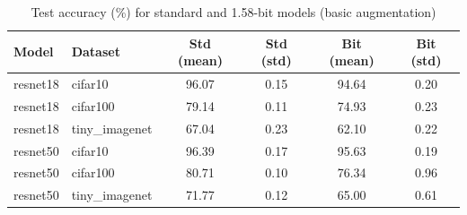 \begin{table}[h]
\centering
\caption{Test accuracy (\%) for standard and 1.58-bit models (basic augmentation)}
\label{tab:accuracy_basic}
\begin{tabular}{llcccc}
\toprule
Model & Dataset & Std (mean) & Std (std) & Bit (mean) & Bit (std) \\
\midrule
resnet18 & cifar10 & 96.07 & 0.15 & 94.64 & 0.20 \\
resnet18 & cifar100 & 79.14 & 0.11 & 74.93 & 0.23 \\
resnet18 & tiny_imagenet & 67.04 & 0.23 & 62.10 & 0.22 \\
resnet50 & cifar10 & 96.39 & 0.17 & 95.63 & 0.19 \\
resnet50 & cifar100 & 80.71 & 0.10 & 76.34 & 0.96 \\
resnet50 & tiny_imagenet & 71.77 & 0.12 & 65.00 & 0.61 \\
\bottomrule
\end{tabular}
\end{table}